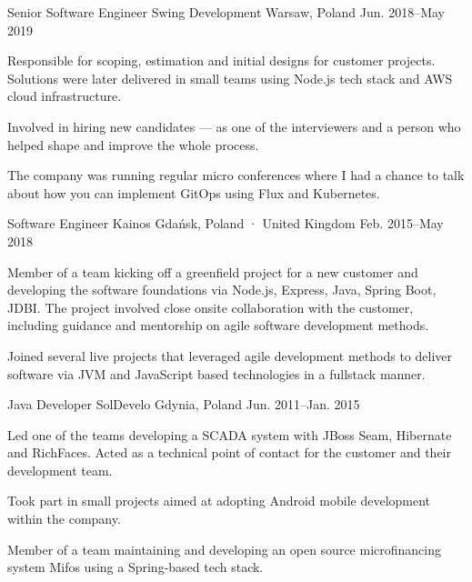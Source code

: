 \begin{cventries}
  \cventry
    {Senior Software Engineer} %
    {Swing Development} %
    {Warsaw, Poland} %
    {Jun. 2018–May 2019} %
    {
      \begin {cvitems} %
        \item {Responsible for scoping, estimation and initial designs for customer projects. Solutions were later delivered in small teams using Node.js tech stack and AWS cloud infrastructure.}
        \item {Involved in hiring new candidates — as one of the interviewers and a person who helped shape and improve the whole process.}
        \item {The company was running regular micro conferences where I had a chance to talk about how you can implement GitOps using Flux and Kubernetes.}
      \end {cvitems}
    }

  \cventry
    {Software Engineer} %
    {Kainos} %
    {Gdańsk, Poland · United Kingdom} %
    {Feb. 2015–May 2018} %
    {
      \begin{cvitems} %
        \item {Member of a team kicking off a greenfield project for a new customer and developing the software foundations via Node.js, Express, Java, Spring Boot, JDBI. The project involved close onsite collaboration with the customer, including guidance and mentorship on agile software development methods.}
        \item {Joined several live projects that leveraged agile development methods to deliver software via JVM and JavaScript based technologies in a fullstack manner.}
      \end{cvitems}
    }

  \cventry
    {Java Developer} %
    {SolDevelo} %
    {Gdynia, Poland} %
    {Jun. 2011–Jan. 2015} %
    {
      \begin{cvitems} %
        \item {Led one of the teams developing a SCADA system with JBoss Seam, Hibernate and RichFaces. Acted as a technical point of contact for the customer and their development team.}
        \item {Took part in small projects aimed at adopting Android mobile development within the company.}
        \item {Member of a team maintaining and developing an open source microfinancing system Mifos using a Spring-based tech stack.}
      \end{cvitems}
    }

\end{cventries}
